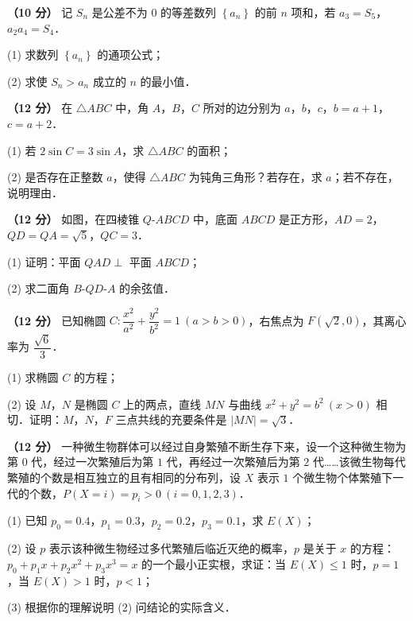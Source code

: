 \begin{question}
\textbf{（10 分）} 记 $S_n$ 是公差不为 $0$ 的等差数列 $\left\{a_n\right\}$ 的前 $n$ 项和，若 $a_3=S_5$，$a_2a_4=S_4$．

  (1) 求数列 $\left\{a_n\right\}$ 的通项公式；

  (2) 求使 $S_n>a_n$ 成立的 $n$ 的最小值．

\end{question}
\begin{question}
\textbf{（12 分）} 在 $\triangle ABC$ 中，角 $A$，$B$，$C$ 所对的边分别为 $a$，$b$，$c$，$b=a+1$，$c=a+2$．

  (1) 若 $2\sin C=3\sin A$，求 $\triangle ABC$ 的面积；

  (2) 是否存在正整数 $a$，使得 $\triangle ABC$ 为钝角三角形？若存在，求 $a$；若不存在，说明理由．

\Needspace{0.4\textheight}
\end{question}
\begin{question}
\textbf{（12 分）} 如图，在四棱锥 $Q\text{-}ABCD$ 中，底面 $ABCD$ 是正方形，$AD=2$，$QD=QA=\sqrt5$，$QC=3$．
\nopagebreak[4]
\begin{center}\end{center}
\nopagebreak[4]
  (1) 证明：平面 $QAD\perp$ 平面 $ABCD$；

  (2) 求二面角 $B\text{-}QD\text{-}A$ 的余弦值．

\end{question}
\begin{question}
\textbf{（12 分）} 已知椭圆 $C:\dfrac{x^{2}}{a^{2}}+\dfrac{y^{2}}{b^{2}}=1\ (a>b>0)$，右焦点为 $F\left(\sqrt2,0\right)$，其离心率为 $\dfrac{\sqrt6}3$．

  (1) 求椭圆 $C$ 的方程；

  (2) 设 $M$，$N$ 是椭圆 $C$ 上的两点，直线 $MN$ 与曲线 $x^{2}+y^{2}=b^{2}\ (x>0)$ 相切．证明：$M$，$N$，$F$ 三点共线的充要条件是 $|MN|=\sqrt3$．

\end{question}
\begin{question}
\textbf{（12 分）} 一种微生物群体可以经过自身繁殖不断生存下来，设一个这种微生物为第 $0$ 代，经过一次繁殖后为第 $1$ 代，再经过一次繁殖后为第 $2$ 代……该微生物每代繁殖的个数是相互独立的且有相同的分布列，设 $X$ 表示 $1$ 个微生物个体繁殖下一代的个数，$P(X=i)=p_i>0\ (i=0,1,2,3)$．

  (1) 已知 $p_0=0.4$，$p_1=0.3$，$p_2=0.2$，$p_3=0.1$，求 $E(X)$；

  (2) 设 $p$ 表示该种微生物经过多代繁殖后临近灭绝的概率，$p$ 是关于 $x$ 的方程：$p_0+p_1x+p_2x^{2}+p_3x^{3}=x$ 的一个最小正实根，求证：当 $E(X)\le1$ 时，$p=1$，当 $E(X)>1$ 时，$p<1$；

  (3) 根据你的理解说明 (2) 问结论的实际含义．

\end{question}
